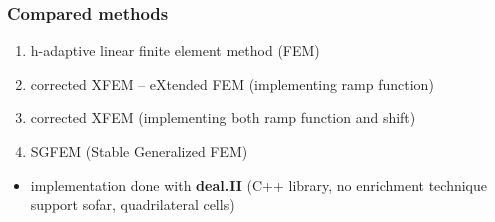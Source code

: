 \documentclass[10pt, xcolor=dvipsnames]{beamer} %
\begin{document}
\begin{frame}
  \frametitle{Compared methods}
  \begin{enumerate}
    \setlength{\itemsep}{15pt}
    \item h-adaptive linear finite element method (FEM)  
    \item corrected XFEM -- eXtended FEM (implementing ramp function)
    \item corrected XFEM (implementing both ramp function and shift)
    \item SGFEM (Stable Generalized FEM)
  \end{enumerate}
  
  \vspace{15pt}
  \begin{itemize}
    \item implementation done with {\bf deal.II} \newline
          (C++ library, no enrichment technique support sofar,  quadrilateral cells)
  \end{itemize}
\end{frame}
\end{document}
